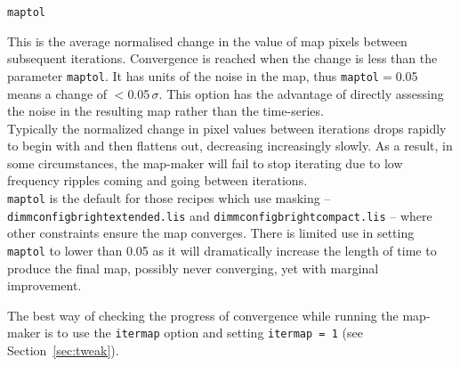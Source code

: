 \documentclass[twoside,11pt]{article}
\newcommand{\htmlref}[2]{#1}
\newcommand{\latexhtml}[2]{#1}
\renewcommand{\_}{\texttt{\symbol{95}}}
\newcommand{\param}[1]{\texttt{#1}}
\newcommand{\cref}[3]{\latexhtml{#1~\ref{#2}}{\htmlref{#3}{#2}}}
\begin{document}
\begin{minipage}[t]{0.1\linewidth}
\texttt{maptol}
\end{minipage}
\begin{minipage}[t]{0.9\linewidth}
This is the average normalised change in the value of map pixels
between subsequent iterations. Convergence is reached when the change
is less than the parameter \texttt{maptol}. It has units of the noise
in the map, thus \texttt{maptol}$=$0.05 means a change of
$<$0.05\,$\sigma$. This option has the advantage of directly assessing
the noise in the resulting map rather than the time-series.
\vspace{3mm}\\
Typically the normalized change in pixel values between iterations
drops rapidly to begin with and then flattens out, decreasing
increasingly slowly. As a result, in some circumstances, the map-maker
will fail to stop iterating due to low frequency ripples coming and
going between iterations.
\vspace{3mm}\\
\texttt{maptol} is the default for those recipes which use
masking -- \texttt{dimmconfig\_bright\_extended.lis} and
\texttt{dimmconfig\_bright\_compact.lis} -- where other constraints
ensure the map converges. There is limited use in setting
\texttt{maptol} to lower than 0.05  as it will dramatically increase
the length of time to produce the final map, possibly never converging,
yet with marginal improvement.
\vspace{3mm}\\
\end{minipage}
The best way of checking the progress of convergence while running the
map-maker is to use the \param{itermap} option and setting
\param{itermap = 1} (see \cref{Section}{sec:tweak}{Tweaking the
Configuration File}).
\end{document}
